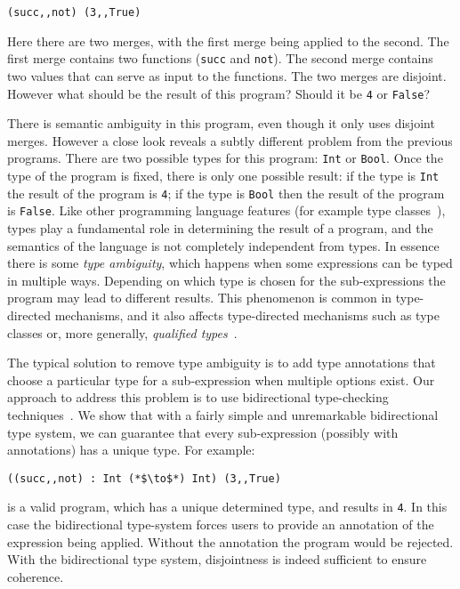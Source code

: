 \begin{lstlisting}
(succ,,not) (3,,True)
\end{lstlisting}

\noindent Here there are two merges, with the first merge being applied to the second. 
The first merge contains two functions 
(\lstinline$succ$ and \lstinline$not$). The second merge contains two values 
that can serve as input to the functions. The two merges are disjoint. 
However what should be the result of this program? Should it be 
\lstinline$4$ or \lstinline$False$? %

There is semantic ambiguity in this program, even though it only uses
disjoint merges. However a close look reveals 
a subtly different problem from the previous programs. There are two possible 
types for this program: \lstinline{Int} or \lstinline{Bool}. Once the type 
of the program is fixed, there is only one possible result: if the type is 
\lstinline$Int$ the result of the program is \lstinline$4$; if the type 
is \lstinline$Bool$ then the result of the program is \lstinline$False$. 
Like other programming language features (for example type classes~\cite{Wadler89ad-hoc}), 
types play a fundamental role in determining the result of a program, and the 
semantics of the language is not completely independent from types. 
In essence there is some \emph{type ambiguity}, which happens 
when some expressions can 
be typed in multiple ways. Depending on which type is chosen 
for the sub-expressions the program may lead to different results. 
This phenomenon is common in type-directed mechanisms, and it also 
affects type-directed mechanisms such as type classes or, more
generally, \emph{qualified types}~\cite{Mark93coherence}.

The typical solution to remove type ambiguity is to add type
annotations that choose a particular type for a sub-expression when
multiple options exist. Our approach to address this problem is to 
use bidirectional type-checking techniques~\cite{Pierce00local,Dunfield04tri}. We show that 
with a fairly simple and unremarkable bidirectional type system, we can guarantee 
that every sub-expression (possibly with annotations) has a unique
type. For example:

\begin{lstlisting}
((succ,,not) : Int (*$\to$*) Int) (3,,True)
\end{lstlisting}

\noindent is a valid \name program, which has a unique determined type, and results in
\lstinline$4$. In this case the bidirectional type-system 
forces users to provide an annotation of the expression being applied.
Without the annotation the program would be rejected. With the
bidirectional type system, disjointness is indeed sufficient to ensure coherence. 

